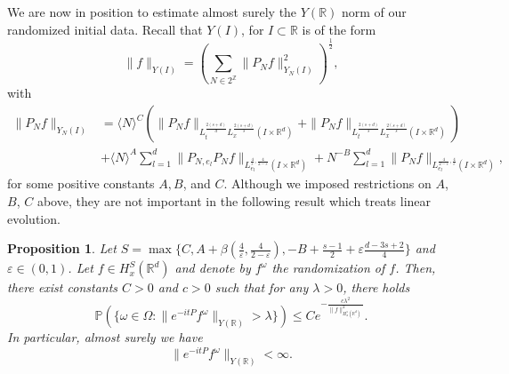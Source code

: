 \documentclass[10pt,leqno]{amsart}
\newtheorem{prop}[thm]{Proposition} %
\newcommand{\R}{\mathbb{R}} %
\numberwithin{equation}{section}
\newcommand{\Z}{\mathbb{Z}}
\begin{document}
We are now in position to estimate almost surely the $Y(\R)$ norm of our randomized initial data. Recall that $Y(I )$, for $I\subset \R$ is of the form
$$\|f\|_{Y(I)} = \left(\sum_{N\in 2^{\Z}}  \|P_N f\|_{Y_N(I)}^2\right)^{\frac{1}{2}},$$
with
\begin{align*}
\|P_N f\|_{Y_N(I)}&= \langle N\rangle^C \left(\|P_N f\|_{L_t^{\frac{2(s+d)}{d}} L_x^{\frac{2(s+d)}{s}} (I\times \R^d)} +\|P_N f\|_{L_t^{\frac{2(s+d)}{s}} L_x^{\frac{2(s+d)}{s}}(I\times \R^d) } \right)\\
&+\langle N\rangle^A \sum_{l=1}^d \|P_{N,e_l} P_N f \|_{L^{\frac{4}{\varepsilon},\frac{4}{2-\varepsilon}}_{e_l}(I\times \R^d) } +N^{-B} \sum_{l=1}^d \|P_N f\|_{L^{\frac{4}{2-\varepsilon},\frac{4}{\varepsilon}}_{e_l} (I\times \R^d) },  
\end{align*}
for some positive constants $A,B$, and $C$. Although we imposed restrictions on $A$, $B$, $C$ above, they are not important in the following result which treats linear evolution. 


\begin{prop}
\label{estY}
Let $S= \max\{C, A+\beta (\frac{4}{\varepsilon} , \frac{4}{2-\varepsilon}), -B+\frac{s-1}{2} + \varepsilon  \frac{d -3s+2}{4} \}$ and $\varepsilon \in (0, 1)$. Let $f\in H_x^S (\R^d)$ and denote by $f^\omega$ the randomization of $f$. Then, there exist constants $C>0$ and $c>0$ such that for any $\lambda >0$, there holds
$$\mathbb{P} \left(\{ \omega \in \Omega : \| e^{-it P} f^\omega \|_{Y(\R)} >\lambda \} \right) \leq C e^{-\frac{c \lambda^2}{ \|f\|_{H_x^s (\R^d )}^{2}} }.$$
In particular, almost surely we have
$$\| e^{-it P} f^\omega \|_{Y(\R)} <\infty. $$
\end{prop}
\end{document}
